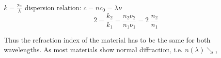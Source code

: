 $k = \frac{2 \pi}{\lambda}$
dispersion relation: $c = n c_0 = \lambda \nu$
\begin{equation}
2 = \frac{k_2}{k_1} = \frac{n_2 \nu_2}{n_1 \nu_1} = 2\;\frac{n_2}{n_1}
\end{equation}

Thus the refraction index of the material has to be the same for both wavelengths. As most materials show normal diffraction, i.e. $n(\lambda) \searrow$, 







